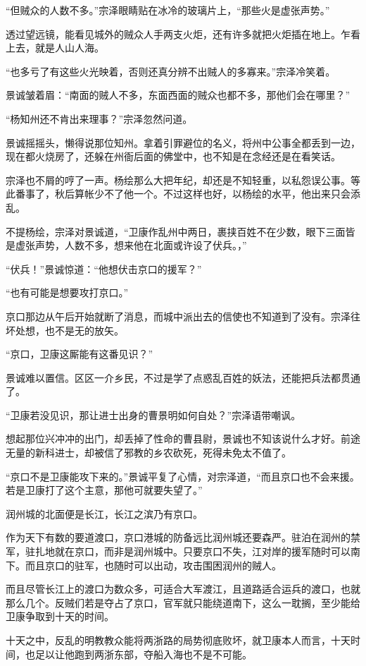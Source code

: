 “但贼众的人数不多。”宗泽眼睛贴在冰冷的玻璃片上，“那些火是虚张声势。”

透过望远镜，能看见城外的贼众人手两支火炬，还有许多就把火炬插在地上。乍看上去，就是人山人海。

“也多亏了有这些火光映着，否则还真分辨不出贼人的多寡来。”宗泽冷笑着。

景诚皱着眉：“南面的贼人不多，东面西面的贼众也都不多，那他们会在哪里？”

“杨知州还不肯出来理事？”宗泽忽然问道。

景诚摇摇头，懒得说那位知州。拿着引罪避位的名义，将州中公事全都丢到一边，现在都火烧房了，还躲在州衙后面的佛堂中，也不知是在念经还是在看笑话。

宗泽也不屑的哼了一声。杨绘那么大把年纪，却还是不知轻重，以私怨误公事。等此番事了，秋后算帐少不了他一个。不过这样也好，以杨绘的水平，他出来只会添乱。

不提杨绘，宗泽对景诚道，“卫康作乱州中两日，裹挟百姓不在少数，眼下三面皆是虚张声势，人数不多，想来他在北面或许设了伏兵。，”

“伏兵！”景诚惊道：“他想伏击京口的援军？”

“也有可能是想要攻打京口。”

京口那边从午后开始就断了消息，而城中派出去的信使也不知道到了没有。宗泽往坏处想，也不是无的放矢。

“京口，卫康这厮能有这番见识？”

景诚难以置信。区区一介乡民，不过是学了点惑乱百姓的妖法，还能把兵法都贯通了。

“卫康若没见识，那让进士出身的曹景明如何自处？”宗泽语带嘲讽。

想起那位兴冲冲的出门，却丢掉了性命的曹县尉，景诚也不知该说什么才好。前途无量的新科进士，却被信了邪教的乡农砍死，死得未免太不值了。

“京口不是卫康能攻下来的。”景诚平复了心情，对宗泽道，“而且京口也不会来援。若是卫康打了这个主意，那他可就要失望了。”

润州城的北面便是长江，长江之滨乃有京口。

作为天下有数的要道渡口，京口港城的防备远比润州城还要森严。驻泊在润州的禁军，驻扎地就在京口，而非是润州城中。只要京口不失，江对岸的援军随时可以南下。而且京口的驻军，也随时可以出动，攻击围困润州的贼人。

而且尽管长江上的渡口为数众多，可适合大军渡江，且道路适合运兵的渡口，也就那么几个。反贼们若是夺占了京口，官军就只能绕道南下，这么一耽搁，至少能给卫康争取到十天的时间。

十天之中，反乱的明教教众能将两浙路的局势彻底败坏，就卫康本人而言，十天时间，也足以让他跑到两浙东部，夺船入海也不是不可能。

